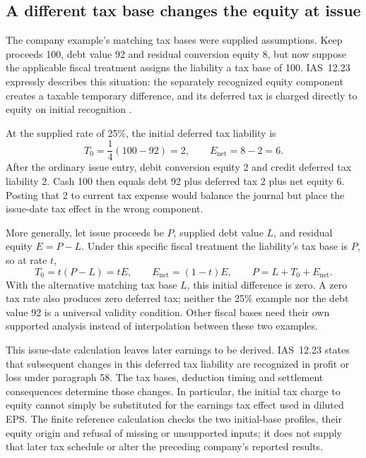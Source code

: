 \subsection{A different tax base changes the equity at issue}
\label{sec:compound-tax-basis}

The company example's matching tax bases were supplied assumptions. Keep
proceeds 100, debt value 92 and residual conversion equity 8, but now suppose
the applicable fiscal treatment assigns the liability a tax base of 100.
IAS~12.23 expressly describes this situation: the separately recognized equity
component creates a taxable temporary difference, and its deferred tax is
charged directly to equity on initial recognition
\citep[IAS~12, paragraphs 23 and 61A]{eu20231803}.

At the supplied rate of 25\%, the initial deferred tax liability is
\[
 T_0=\frac14(100-92)=2,\qquad E_{\mathrm{net}}=8-2=6.
\]
After the ordinary issue entry, debit conversion equity 2 and credit deferred
tax liability 2. Cash 100 then equals debt 92 plus deferred tax 2 plus net
equity 6. Posting that 2 to current tax expense would balance the journal
but place the issue-date tax effect in the wrong component.

More generally, let issue proceeds be $P$, supplied debt value $L$, and
residual equity $E=P-L$. Under this specific fiscal treatment the liability's
tax base is $P$, so at rate $t$,
\[
 T_0=t(P-L)=tE,\qquad E_{\mathrm{net}}=(1-t)E,
 \qquad P=L+T_0+E_{\mathrm{net}}.
\]
With the alternative matching tax base $L$, this initial difference is zero.
A zero tax rate also produces zero deferred tax; neither the 25\% example
nor the debt value 92 is a universal validity condition. Other fiscal bases
need their own supported analysis instead of interpolation between these
two examples.

This issue-date calculation leaves later earnings to be derived. IAS~12.23
states that subsequent changes in this deferred tax liability are recognized
in profit or loss under paragraph 58. The tax bases, deduction timing and
settlement consequences determine those changes. In particular, the initial
tax charge to equity cannot simply be substituted for the earnings tax
effect used in diluted EPS. The finite  reference
calculation checks the two initial-base profiles, their equity origin and
refusal of missing or unsupported inputs; it does not supply that later
tax schedule or alter the preceding company's reported results.
